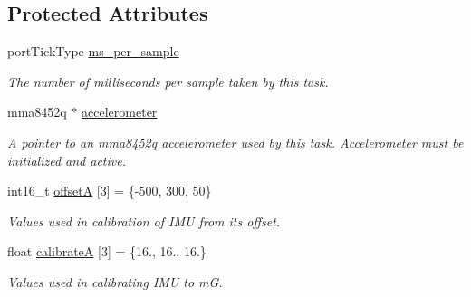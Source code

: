 \subsection*{Protected Attributes}
\begin{DoxyCompactItemize}
\item 
port\+Tick\+Type \hyperlink{classtask__imu_ab0a395d04d3293435477ff852ad5ebdb}{ms\+\_\+per\+\_\+sample}\hypertarget{classtask__imu_ab0a395d04d3293435477ff852ad5ebdb}{}\label{classtask__imu_ab0a395d04d3293435477ff852ad5ebdb}

\begin{DoxyCompactList}\small\item\em The number of milliseconds per sample taken by this task. \end{DoxyCompactList}\item 
mma8452q $\ast$ \hyperlink{classtask__imu_af553e9fc60df47d03c879e94487ac2fa}{accelerometer}\hypertarget{classtask__imu_af553e9fc60df47d03c879e94487ac2fa}{}\label{classtask__imu_af553e9fc60df47d03c879e94487ac2fa}

\begin{DoxyCompactList}\small\item\em A pointer to an mma8452q accelerometer used by this task. Accelerometer must be initialized and active. \end{DoxyCompactList}\item 
int16\+\_\+t \hyperlink{classtask__imu_a5b768a218bf1d4099177009f819ef8d0}{offsetA} \mbox{[}3\mbox{]} = \{-\/500, 300, 50\}\hypertarget{classtask__imu_a5b768a218bf1d4099177009f819ef8d0}{}\label{classtask__imu_a5b768a218bf1d4099177009f819ef8d0}

\begin{DoxyCompactList}\small\item\em Values used in calibration of I\+MU from its offset. \end{DoxyCompactList}\item 
float \hyperlink{classtask__imu_a255abac4e865398955b0a384c808d64b}{calibrateA} \mbox{[}3\mbox{]} = \{16., 16., 16.\}\hypertarget{classtask__imu_a255abac4e865398955b0a384c808d64b}{}\label{classtask__imu_a255abac4e865398955b0a384c808d64b}

\begin{DoxyCompactList}\small\item\em Values used in calibrating I\+MU to mG. \end{DoxyCompactList}\end{DoxyCompactItemize}


